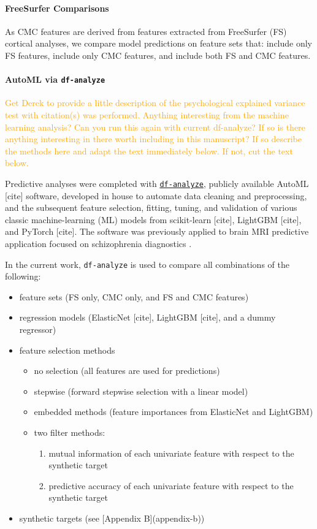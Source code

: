\documentclass{article}
\begin{document}
\paragraph{FreeSurfer Comparisons}

As CMC features are derived from features extracted from FreeSurfer (FS)
cortical analyses, we compare model predictions on feature sets that: include
only FS features, include only CMC features, and include both FS and CMC
features.

\paragraph{AutoML via \texttt{df-analyze}}

\textcolor{orange}{Get Derek to provide a little description of the psychological explained
variance test with citation(s) was performed. Anything interesting from the
machine learning analysis? Can you run this again with current df-analyze? If
so is there anything interesting in there worth including in this manuscript?
If so describe the methods here and adapt the text immediately below. If not,
cut the text below.}

Predictive analyses were completed with
\href{github.com/stfxecutables/df-analyze}{\texttt{df-analyze}}, publicly
available AutoML [cite] software, developed in house to automate data
cleaning and preprocessing, and the subsequent feature selection, fitting,
tuning, and validation of various classic machine-learning (ML) models from
scikit-learn [cite], LightGBM [cite], and PyTorch [cite]. The software was
previously applied to brain MRI predictive application focused on
schizophrenia diagnostics \citep{levmanMorphologicalStudySchizophrenia2022}.

In the current work, \texttt{df-analyze} is used to compare all combinations
of the following:

\begin{itemize}
\item feature sets (FS only, CMC only, and FS and CMC features)
\item regression models (ElasticNet [cite], LightGBM [cite], and a dummy regressor)
\item feature selection methods
	\begin{itemize}
		\item no selection (all features are used for predictions)
		\item stepwise (forward stepwise selection with a linear model)
		\item embedded methods (feature importances from ElasticNet and LightGBM)
		\item two filter methods:
		\begin{enumerate}
			\item mutual information of each univariate feature with respect to the synthetic target
			\item predictive accuracy of each univariate feature with respect to the synthetic target
		\end{enumerate}
	\end{itemize}
\item synthetic targets (see [Appendix B](appendix-b))
\end{itemize}
\end{document}
